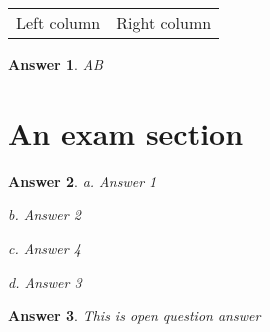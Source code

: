 \documentclass[12pt,a4paper,notitlepage]{article}
\newtheorem{answer}{Answer}
\begin{document}
    \begin{tabular}{*{2}{p{ }}}
        Left column & Right column
    \end{tabular}



    \begin{answer}
        AB
    \end{answer}

    \section{{An exam section}}



    \begin{answer}
        a. Answer 1

    b. Answer 2

    c. Answer 4

    d. Answer 3


    \end{answer}

    \begin{answer}
        This is open question answer
    \end{answer}
\end{document}
